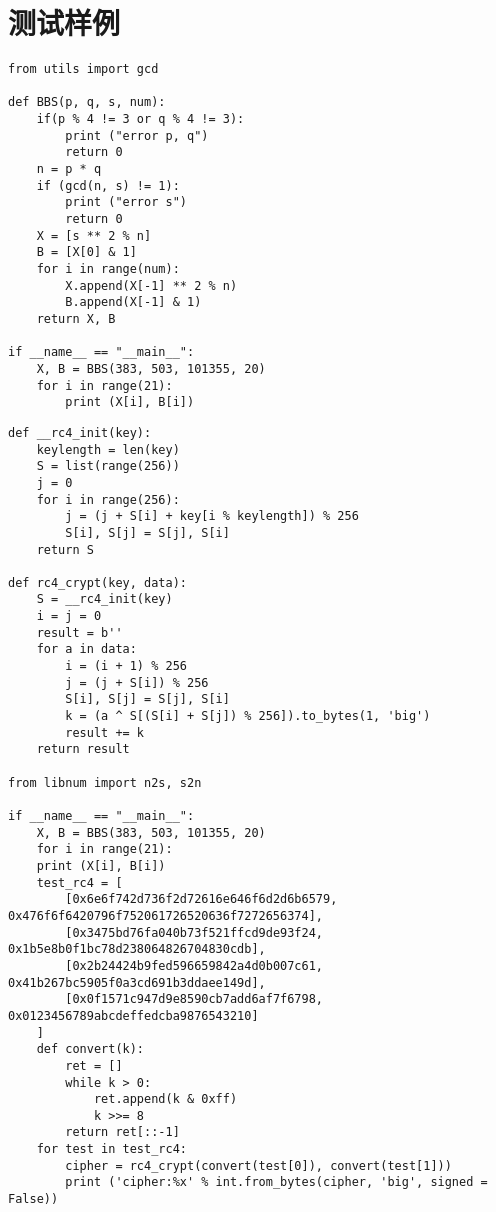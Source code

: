 \documentclass[a4paper, zihao=-4, UTF-8]{ctexart}
\begin{document}
			\section{测试样例}\label{apx:testdata}
			\begin{lstlisting}[caption={BBS算法测试样例}, label={lst:bbstestdata}]
from utils import gcd

def BBS(p, q, s, num):
	if(p % 4 != 3 or q % 4 != 3):
		print ("error p, q")
		return 0
	n = p * q
	if (gcd(n, s) != 1):
		print ("error s")
		return 0
	X = [s ** 2 % n]
	B = [X[0] & 1]
	for i in range(num):
		X.append(X[-1] ** 2 % n)
		B.append(X[-1] & 1)
	return X, B

if __name__ == "__main__":
    X, B = BBS(383, 503, 101355, 20)
    for i in range(21):
        print (X[i], B[i])
			\end{lstlisting}
			\begin{lstlisting}[caption={RC4密码测试样例}, label={lst:rc4testdata}]
def __rc4_init(key):
	keylength = len(key)
	S = list(range(256))
	j = 0
	for i in range(256):
		j = (j + S[i] + key[i % keylength]) % 256
		S[i], S[j] = S[j], S[i]
	return S

def rc4_crypt(key, data):
	S = __rc4_init(key)
	i = j = 0
	result = b''
	for a in data:
		i = (i + 1) % 256
		j = (j + S[i]) % 256
		S[i], S[j] = S[j], S[i]
		k = (a ^ S[(S[i] + S[j]) % 256]).to_bytes(1, 'big')
		result += k
	return result

from libnum import n2s, s2n

if __name__ == "__main__":
	X, B = BBS(383, 503, 101355, 20)
	for i in range(21):
	print (X[i], B[i])
	test_rc4 = [
		[0x6e6f742d736f2d72616e646f6d2d6b6579, 0x476f6f6420796f752061726520636f7272656374],
		[0x3475bd76fa040b73f521ffcd9de93f24, 0x1b5e8b0f1bc78d238064826704830cdb],
		[0x2b24424b9fed596659842a4d0b007c61, 0x41b267bc5905f0a3cd691b3ddaee149d],
		[0x0f1571c947d9e8590cb7add6af7f6798, 0x0123456789abcdeffedcba9876543210]
	]
	def convert(k):
		ret = []
		while k > 0:
			ret.append(k & 0xff)
			k >>= 8
		return ret[::-1]
	for test in test_rc4:
		cipher = rc4_crypt(convert(test[0]), convert(test[1]))
		print ('cipher:%x' % int.from_bytes(cipher, 'big', signed = False))
			\end{lstlisting}
\end{document}
